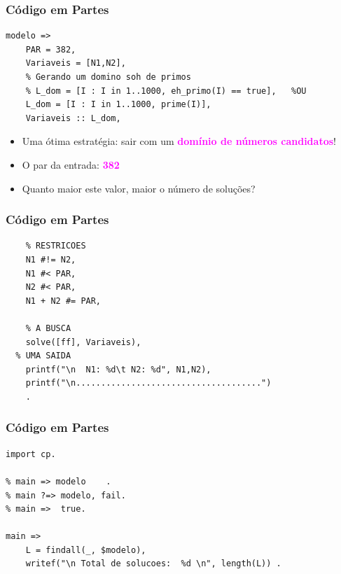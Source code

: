 \begin{frame}[fragile] 

\frametitle{Código em Partes}

\begin{footnotesize}
\begin{verbatim}
modelo => 
    PAR = 382,
    Variaveis = [N1,N2],
    % Gerando um domino soh de primos
    % L_dom = [I : I in 1..1000, eh_primo(I) == true],   %OU
    L_dom = [I : I in 1..1000, prime(I)],
    Variaveis :: L_dom,
\end{verbatim}
\end{footnotesize}
   
   
   
   \begin{itemize}
   \pause
     \item Uma ótima estratégia: sair com um \textbf{\textcolor{magenta}{domínio de números candidatos}}!
   \pause
     \item O par da entrada: \textcolor{magenta}{\textbf{382}}

     \item Quanto maior este valor, maior o número de soluções?
   \end{itemize}

    
\end{frame}
\begin{frame}[fragile] 

\frametitle{Código em Partes}

\begin{footnotesize}
\begin{verbatim}
    % RESTRICOES
    N1 #!= N2,
    N1 #< PAR,  
    N2 #< PAR,
    N1 + N2 #= PAR,
  
	% A BUSCA
	solve([ff], Variaveis),
  % UMA SAIDA
	printf("\n  N1: %d\t N2: %d", N1,N2),
	printf("\n.....................................")
	.
\end{verbatim}
\end{footnotesize}
    
\end{frame}
\begin{frame}[fragile] 

\frametitle{Código em Partes}

\begin{footnotesize}
\begin{verbatim}
import cp.

% main => modelo	.
% main ?=> modelo, fail.	
% main =>  true.	

main =>
    L = findall(_, $modelo),
    writef("\n Total de solucoes:  %d \n", length(L)) .

\end{verbatim}
\end{footnotesize}
    
\end{frame}



